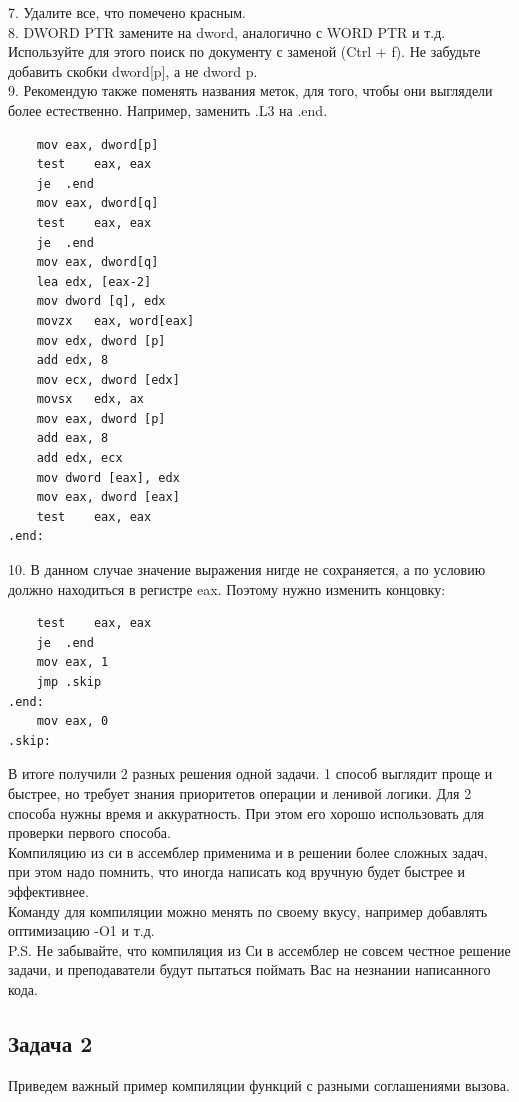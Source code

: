 \documentclass[12pt, letterpaper]{article}
\begin{document}
 7. Удалите все, что помечено красным.\\
 8. DWORD PTR замените на dword, аналогично с WORD PTR и т.д. Используйте для этого поиск по документу с заменой (Ctrl + f). Не забудьте добавить скобки dword[p], а не dword p.\\
 9. Рекомендую также поменять названия меток, для того, чтобы они выглядели более естественно. Например, заменить .L3 на .end.
 \begin{verbatim}
    mov	eax, dword[p]
    test	eax, eax
    je	.end
    mov	eax, dword[q]
    test	eax, eax
    je	.end
    mov	eax, dword[q]
    lea	edx, [eax-2]
    mov	dword [q], edx
    movzx	eax, word[eax]
    mov	edx, dword [p]
    add	edx, 8
    mov	ecx, dword [edx]
    movsx	edx, ax
    mov	eax, dword [p]
    add	eax, 8
    add	edx, ecx
    mov	dword [eax], edx
    mov	eax, dword [eax]
    test	eax, eax
.end:
 \end{verbatim}
 10. В данном случае значение выражения нигде не сохраняется, а по условию должно находиться в регистре eax. Поэтому нужно изменить концовку:
 \begin{verbatim}
    test	eax, eax
    je	.end
    mov eax, 1
    jmp .skip
.end:
    mov eax, 0
.skip:
 \end{verbatim}
 
 В итоге получили 2 разных решения одной задачи. 1 способ выглядит проще и быстрее, но требует знания приоритетов операции и ленивой логики. Для 2 способа нужны время и аккуратность. При этом его хорошо использовать для проверки первого способа.\\
 
 Компиляцию из си в ассемблер применима и в решении более сложных задач, при этом надо помнить, что иногда написать код вручную будет быстрее и эффективнее.\\
 
 Команду для компиляции можно менять по своему вкусу, например добавлять оптимизацию -O1 и т.д.\\
 
 P.S. Не забывайте, что компиляция из Си в ассемблер не совсем честное решение задачи, и преподаватели будут пытаться поймать Вас на незнании написанного кода.
 \newpage
 \subsection{Задача 2}
 Приведем важный пример компиляции функций с разными соглашениями вызова.\\
 
\end{document}
